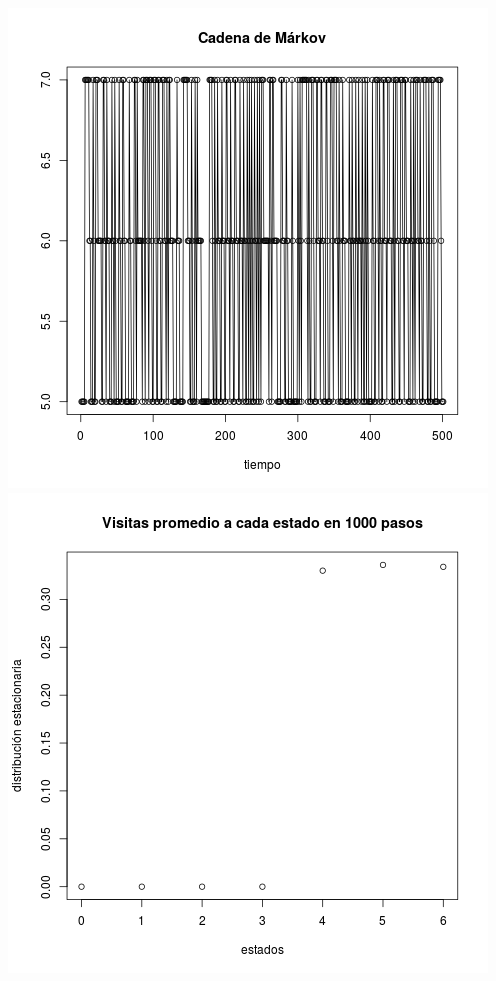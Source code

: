 \documentclass[paper=letter, fontsize=12pt]{scrartcl} %
\numberwithin{equation}{section} %
\numberwithin{figure}{section} %
\numberwithin{table}{section} %
\begin{document}
\includegraphics[scale=0.4]{ej8_1.png}
\includegraphics[scale=0.4]{ej8_2.png} \par
\end{document}
